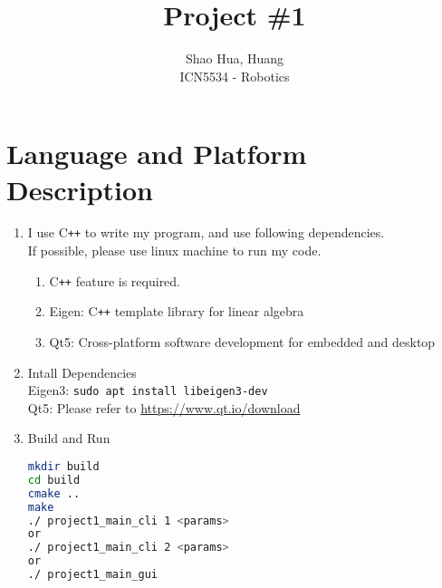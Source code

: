 \documentclass[12pt]{article}
\title{Project \#1}
\author{Shao Hua, Huang\\
ICN5534 - Robotics}
\begin{document}
\maketitle
\section{Language and Platform Description}
\begin{enumerate}
  \item
  I use C\texttt{++} to write my program, and use following dependencies.\\
  If possible, please use linux machine to run my code.
  \begin{enumerate}
    \item C\texttt{++} feature is required.
    \item Eigen: C\texttt{++} template library for linear algebra
    \item Qt5: Cross-platform software development for embedded and desktop
  \end{enumerate}
  \item Intall Dependencies\\
  Eigen3: \lstinline{sudo apt install libeigen3-dev}\\
  Qt5: Please refer to \url{https://www.qt.io/download}
  \item Build and Run
  \begin{lstlisting}[language=bash]
mkdir build
cd build
cmake ..
make
./ project1_main_cli 1 <params>
or
./ project1_main_cli 2 <params>
or
./ project1_main_gui
  \end{lstlisting}
\end{enumerate}
\end{document}

